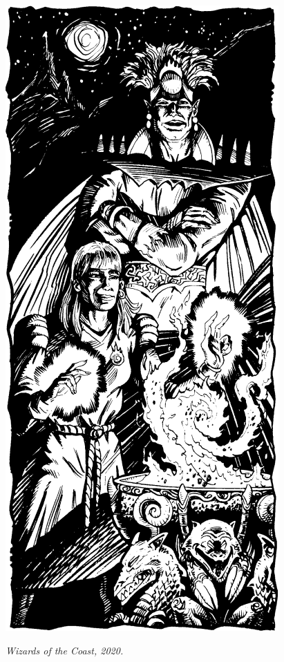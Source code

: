 \begin{figure}[t!]
\centering
\includegraphics[width=\columnwidth+2mm]{images/cleric-2.png}
\par\textit{\small\textcopyright Wizards of the Coast, 2020.}
\end{figure}

